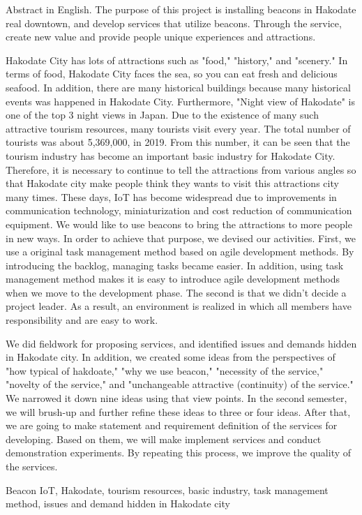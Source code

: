 \begin{eabstract} Abstract in English. 
The purpose of this project is installing beacons in Hakodate real downtown, and develop services that utilize beacons. Through the service, create new value and provide people unique experiences and attractions.

Hakodate City has lots of attractions such as "food," "history," and "scenery."
In terms of food, Hakodate City faces the sea, so you can eat fresh and delicious seafood.
In addition, there are many historical buildings because many historical events was happened in Hakodate City.
Furthermore, "Night view of Hakodate" is one of the top 3 night views in Japan.
Due to the existence of many such attractive tourism resources, many tourists visit every year.
The total number of tourists was about 5,369,000, in 2019.
From this number, it can be seen that the tourism industry has become an important basic industry for Hakodate City.
Therefore, it is necessary to continue to tell the attractions from various angles so that Hakodate city make people think they wants to visit this attractions city many times.
These days, IoT has become widespread due to improvements in communication technology, miniaturization and cost reduction of communication equipment.
We would like to use beacons to bring the attractions to more people in new ways.
In order to achieve that purpose, we devised our activities.
First, we use a original task management method based on agile development methods.
By introducing the backlog, managing tasks became easier.
In addition, using task management method makes it is easy to introduce agile development methods when we move to the development phase.
The second is that we didn't decide a project leader.
As a result, an environment is realized in which all members have responsibility and are easy to work.

We did fieldwork for proposing services, and identified issues and demands hidden in Hakodate city.
In addition, we created some ideas from the perspectives of "how typical of hakdoate," "why we use beacon," "necessity of the service," "novelty of the service," and "unchangeable attractive (continuity) of the service."
We narrowed it down nine ideas using that view points.
In the second semester, we will brush-up and further refine these ideas to three or four ideas.
After that, we are going to make statement and  requirement definition of the services for developing.
Based on them, we will make implement services and conduct demonstration experiments.
By repeating this process, we improve the quality of the services. 
\begin{ekeyword}
Beacon IoT, Hakodate, tourism resources, basic industry, task management method, issues and demand hidden in Hakodate city
\end{ekeyword}
\end{eabstract}
